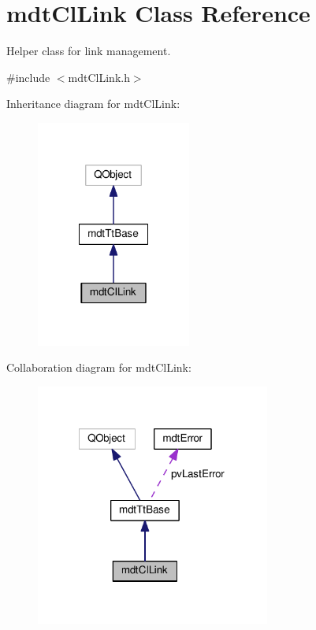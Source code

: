 \hypertarget{classmdt_cl_link}{\section{mdt\-Cl\-Link Class Reference}
\label{classmdt_cl_link}
}


Helper class for link management.  




{\ttfamily \#include $<$mdt\-Cl\-Link.\-h$>$}



Inheritance diagram for mdt\-Cl\-Link\-:\nopagebreak
\begin{figure}[H]
\begin{center}
\leavevmode
\includegraphics[width=144pt]{classmdt_cl_link__inherit__graph}
\end{center}
\end{figure}


Collaboration diagram for mdt\-Cl\-Link\-:\nopagebreak
\begin{figure}[H]
\begin{center}
\leavevmode
\includegraphics[width=218pt]{classmdt_cl_link__coll__graph}
\end{center}
\end{figure}
